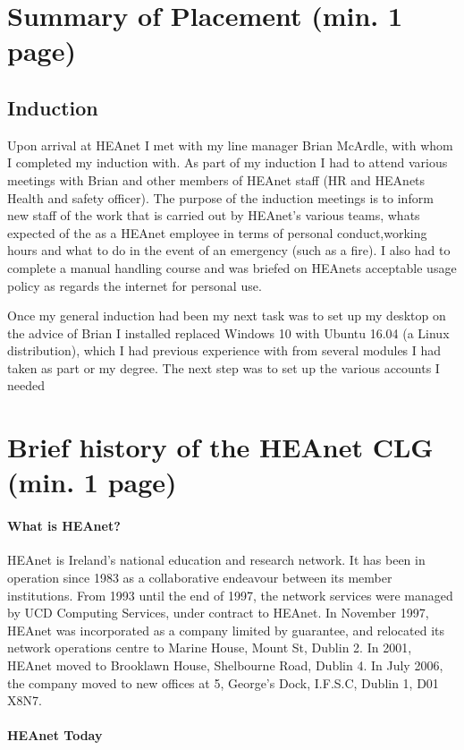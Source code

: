 \documentclass{article}
\begin{document}
	\section{Summary of Placement (min. 1 page)}
	\subsection{Induction}
	Upon arrival at HEAnet I met with my line manager Brian McArdle, with whom I completed my induction with. As part of my induction I had to attend various meetings with Brian and other members of HEAnet staff (HR and HEAnets Health and safety officer). The purpose of the induction meetings is to inform new staff of the work that is carried out by HEAnet's various teams, whats expected of the as a HEAnet employee in terms of personal conduct,working hours and what to do in the event of an emergency (such as a fire). I also had to complete a manual handling course and was briefed on HEAnets acceptable usage policy as regards the internet for personal use.
	
	Once my general induction had been my next task was to set up my desktop on the advice of Brian I installed replaced Windows 10 with Ubuntu 16.04 (a Linux distribution), which I had previous experience with from several modules I had taken as part or my degree. The next step was to set up the various accounts I needed
	\newpage
	\section{Brief history of the HEAnet CLG (min. 1 page)}
	
	\paragraph{What is HEAnet?}
	HEAnet is Ireland's national education and research network. It has been in operation since 1983 as a collaborative endeavour between its member institutions. From 1993 until the end of 1997, the network services were managed by UCD Computing Services, under contract to HEAnet. In November 1997, HEAnet was incorporated as a company limited by guarantee, and relocated its network operations centre to Marine House, Mount St, Dublin 2. In 2001, HEAnet moved to Brooklawn House, Shelbourne Road, Dublin 4. In July 2006, the company moved to new offices at 5, George's Dock, I.F.S.C, Dublin 1, D01 X8N7.
	
	\paragraph{HEAnet Today}
	
\end{document}
